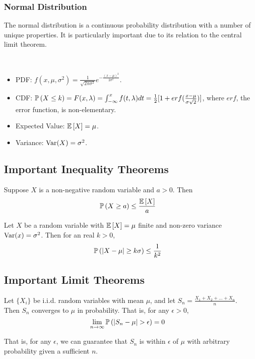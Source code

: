 \documentclass[english, course]{Notes}
\begin{document}
\subsubsection{Normal Distribution}

\begin{remark}
	The normal distribution is a continuous probability distribution with a number of unique properties. It is particularly important due to its relation to the central limit theorem.
\end{remark}

\begin{fact}\ \\
	\begin{itemize}
		\item PDF: $f(x, \mu, \sigma^2) = \frac{1}{\sqrt{2\pi \sigma^2}}e^{-\frac{(x - \mu)^2}{2 \sigma^2}}$.
		\item CDF: $\mathbb{P}\left(X \leq k\right) = F(x, \lambda) = \int_{-\infty}^x f(t, \lambda) dt = \frac{1}{2} [1 + erf(\frac{x - \mu}{\sigma \sqrt{2}})]$, where $erf$, the error function, is non-elementary.
		\item Expected Value: $\mathbb{E}\left[X\right] = \mu$.
		\item Variance: $\operatorname{Var}(X) = \sigma^2$.
	\end{itemize}
\end{fact}

\subsection{Important Inequality Theorems}

\begin{theorem}
Suppose $X$ is a non-negative random variable and $a > 0$. Then
\[\mathbb{P}\left(X \geq a\right) \leq \frac{\mathbb{E}\left[X\right]}{a}\]
\end{theorem}

\begin{theorem}
Let $X$ be a random variable with $\mathbb{E}\left[X\right] = \mu$ finite and non-zero variance $\operatorname{Var}(x) = \sigma^2$. Then for an real $k > 0$,
\[\mathbb{P}\left(|X - \mu| \geq k\sigma\right) \leq \frac{1}{k^2}\]
\end{theorem}

\subsection{Important Limit Theorems}

\begin{theorem}
Let $\{X_i\}$ be i.i.d. random variables with mean $\mu$, and let $S_n = \frac{X_1 + X_2 + \dots + X_n}{n}$. Then $S_n$ converges to $\mu$ in probability. That is, for any $\epsilon > 0$,
\[\lim_{n \to \infty} \mathbb{P}\left(|S_n - \mu| > \epsilon\right) = 0\]

That is, for any $\epsilon$, we can guarantee that $S_n$ is within $\epsilon$ of $\mu$ with arbitrary probability given a sufficient $n$.
\end{theorem}
\end{document}
